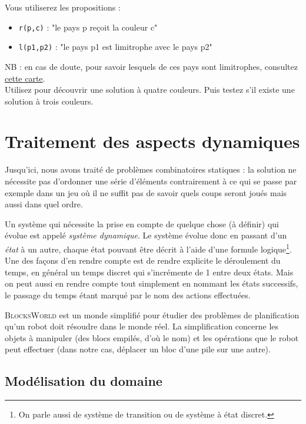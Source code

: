 \noindent Vous utiliserez les propositions : 
\begin{itemize}
\item \texttt{r(p,c)} : "le pays p reçoit la couleur c"
\item \texttt{l(p1,p2)} : "le pays p1 est limitrophe avec le pays p2"
\end{itemize}

NB : en cas de doute, pour savoir lesquels de ces pays sont limitrophes, consultez \href{https://upload.wikimedia.org/wikipedia/commons/6/6a/Europe_countries_map_fr.png}{cette carte}. \\

Utilisez \touist pour découvrir une solution à quatre couleurs. Puis testez s'il existe une solution à trois couleurs. 
\newpage
\section{Traitement des aspects dynamiques}\label{sec:prob}
Jusqu'ici, nous avons traité de problèmes combinatoires statiques : la solution ne nécessite pas d'ordonner une série d'éléments contrairement à ce qui se passe par exemple dans un jeu où il ne suffit pas de savoir quels coups seront joués mais aussi dans quel ordre. 

Un système qui nécessite la prise en compte de quelque chose (à définir) qui évolue est appelé \emph{système dynamique}. Le système évolue donc en passant d'un \emph{état} à un autre, chaque état pouvant être décrit à l'aide d'une formule logique\footnote{On parle aussi de système de transition ou de système à état discret.}. Une des façons d'en rendre compte est de rendre explicite le déroulement du temps, en général un temps discret qui s'incrémente de 1 entre deux états. Mais on peut aussi en rendre compte tout simplement en nommant les états successifs, le passage du temps étant marqué par le nom des actions effectuées. 

\textsc{BlocksWorld} est un monde simplifié pour étudier des problèmes de
planification qu'un robot doit résoudre dans le monde réel. La simplification
concerne les objets à manipuler (des blocs empilés, d'où le nom) et les
opérations que le robot peut effectuer (dans notre cas, déplacer un bloc d'une
pile sur une autre). 
\subsection{Modélisation du domaine}\label{sec:form_dom}

